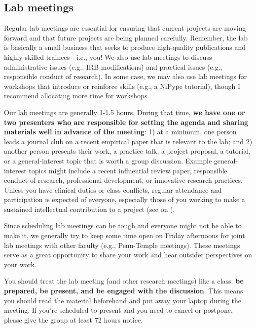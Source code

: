 \documentclass[letterpaper,11pt,oneside]{memoir}
\begin{document}
\subsection{Lab meetings}
Regular lab meetings are essential for ensuring that current projects are moving forward and that future projects are being planned carefully. Remember, the lab is basically a small business that seeks to produce high-quality publications and highly-skilled trainees---i.e., you! We also use lab meetings to discuss administrative issues (e.g., IRB modifications) and practical issues (e.g., responsible conduct of research). In some case, we may also use lab meetings for workshops that introduce or reinforce skills (e.g., a NiPype tutorial), though I recommend allocating more time for workshops. 

Our lab meetings are generally 1-1.5 hours. During that time, \textbf{we have one or two presenters who are responsible for setting the agenda and sharing materials well in advance of the meeting}: 1) at a minimum, one person leads a journal club on a recent empirical paper that is relevant to the lab; and 2) another person presents their work, a practice talk, a project proposal, a tutorial, or a general-interest topic that is worth a group discussion. Example general-interest topics might include a recent influential review paper, responsible conduct of research, professional development, or innovative research practices. Unless you have clinical duties or class conflicts, regular attendance and participation is expected of everyone, especially those of you working to make a sustained intellectual contribution to a project (see  on ).

Since scheduling lab meetings can be tough and everyone might not be able to make it, we generally try to keep some time open on Friday afternoons for joint lab meetings with other faculty (e.g., Penn-Temple meetings). These meetings serve as a great opportunity to share your work and hear outsider perspectives on your work. 

You should treat the lab meeting (and other research meetings) like a class: \textbf{be prepared, be present, and be engaged with the discussion}. This means you should read the material beforehand and put away your laptop during the meeting. If you're scheduled to present and you need to cancel or postpone, please give the group at least 72 hours notice. 
\end{document}

